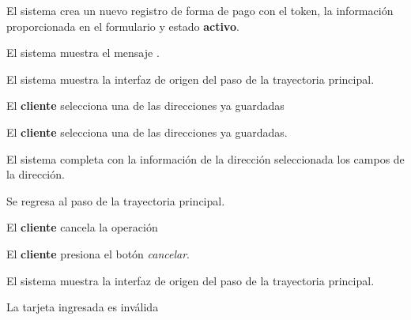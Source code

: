 {\begin{trayectoriaPrincipal}
    \item El sistema crea un nuevo registro de forma de pago con el token, la
      información proporcionada en el formulario y estado \textbf{activo}.

    \item El sistema muestra el mensaje
      .

    \item El sistema muestra la interfaz de origen del paso
       de la trayectoria principal.

  \end{trayectoriaPrincipal}


  \begin{trayectoriaAlternativa}
    {El \textbf{cliente} selecciona una de las direcciones ya guardadas}

    \item El \textbf{cliente} selecciona una de las direcciones ya
      guardadas.

    \item El sistema completa con la información de la dirección seleccionada
      los campos de la dirección.

    \item Se regresa al paso  de la trayectoria
      principal.

  \end{trayectoriaAlternativa}


  \begin{trayectoriaAlternativa}
    {El \textbf{cliente} cancela la operación}

    \item El \textbf{cliente} presiona el botón \textit{cancelar}.

    \item El sistema muestra la interfaz de origen del paso
       de la trayectoria principal.

  \end{trayectoriaAlternativa}


  \begin{trayectoriaAlternativa}
    {La tarjeta ingresada es inválida}


\end{trayectoriaAlternativa}}
